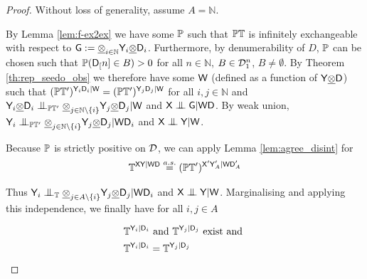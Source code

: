 \begin{proof}
Without loss of generality, assume $A=\mathbb{N}$.

By Lemma \ref{lem:f-ex2ex} we have some $\mathbb{P}$ such that $\mathbb{P}\mathbb{T}$ is infinitely exchangeable with respect to $\mathsf{G}:=\underline{\otimes}_{i\in\mathbb{N}} \mathsf{Y}_i\underline{\otimes}\mathsf{D}_i$. Furthermore, by denumerability of $D$, $\mathbb{P}$ can be chosen such that $\mathbb{P}(\mathsf{D}_[n]\in B)>0$ for all $n\in\mathbb{N}$, $B\in \mathcal{D}_1^n$, $B\neq \emptyset$. By Theorem \ref{th:rep_seedo_obs} we therefore have some $\mathsf{W}$ (defined as a function of $\mathsf{Y}\underline{\otimes} \mathsf{D}$) such that $(\mathbb{P}\mathbb{T}')^{\mathsf{Y}_i\mathsf{D}_i|\mathsf{W}}=(\mathbb{P}\mathbb{T}')^{\mathsf{Y}_j\mathsf{D}_j|\mathsf{W}}$ for all $i,j\in \mathbb{N}$ and $\RV{Y}_i\utimes\RV{D}_i\CI_{\prob{P}\kernel{T}'} \utimes_{j\in\mathbb{N}\setminus\{i\}} \RV{Y}_j \utimes \RV{D}_j | \RV{W}$ and $\RV{X}\CI\RV{G}|\RV{W}\RV{D}$.  By weak union, $\RV{Y}_i\CI_{\prob{P}\kernel{T}'} \utimes_{j\in\mathbb{N}\setminus\{i\}} \RV{Y}_j \utimes \RV{D}_j | \RV{W} \RV{D}_i$ and $\RV{X}\CI\RV{Y}|\RV{W}$.

Because $\mathbb{P}$ is strictly positive on $\mathcal{D}$, we can apply Lemma \ref{lem:agree_disint} for
\begin{align}
    \mathbb{T}^{\mathsf{X}\mathsf{Y}|\mathsf{W}\mathsf{D}} \overset{a.s.}{=} (\mathbb{P}\mathbb{T}')^{\mathsf{X}'\mathsf{Y}'_A|\mathsf{W}\mathsf{D}'_A}
\end{align}

Thus $\RV{Y}_i\CI_{\kernel{T}} \utimes_{j\in A \setminus\{i\}} \RV{Y}_j \utimes \RV{D}_j | \RV{W} \RV{D}_i$ and $\RV{X}\CI\RV{Y}|\RV{W}$. Marginalising and applying this independence, we finally have for all $i, j\in A$

\begin{align}
    \mathbb{T}^{\mathsf{Y}_i|\mathsf{D}_i}&\text{ and }\mathbb{T}^{\mathsf{Y}_j|\mathsf{D}_j}\text{ exist and }\\
    \mathbb{T}^{\mathsf{Y}_i|\mathsf{D}_i} &= \mathbb{T}^{\mathsf{Y}_j|\mathsf{D}_j}
\end{align}
\end{proof}

